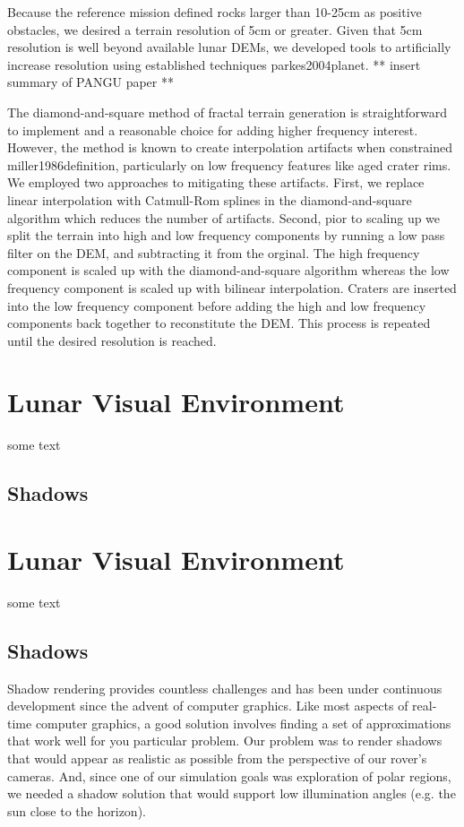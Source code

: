 \documentclass[twocolumn,letterpaper]{IEEEAerospaceCLS}  %
\begin{document}
Because the reference mission defined rocks larger than 10-25cm as positive obstacles, we desired a terrain resolution of 5cm or greater. Given that 5cm resolution is well beyond available lunar DEMs, we developed tools to artificially increase resolution using established techniques {parkes2004planet}. ** insert summary of PANGU paper **

The diamond-and-square method of fractal terrain generation is straightforward to implement and a reasonable choice for adding higher frequency interest. However, the method is known to create interpolation artifacts when constrained {miller1986definition}, particularly on low frequency features like aged crater rims. We employed two approaches to mitigating these artifacts. First, we replace linear interpolation with Catmull-Rom splines in the diamond-and-square algorithm which reduces the number of artifacts. Second, pior to scaling up we split the terrain into high and low frequency components by running a low pass filter on the DEM, and subtracting it from the orginal. The high frequency component is scaled up with the diamond-and-square algorithm whereas the low frequency component is scaled up with bilinear interpolation. Craters are inserted into the low frequency component before adding the high and low frequency components back together to reconstitute the DEM. This process is repeated until the desired resolution is reached. 
  
\section{Lunar Visual Environment}
some text

\subsection{Shadows}

\section{Lunar Visual Environment}
some text

\subsection{Shadows}
Shadow rendering provides countless challenges and has been under continuous development since the advent of computer graphics. Like most aspects of real-time computer graphics, a good solution involves finding a set of approximations that work well for you particular problem. Our problem was to render shadows that would appear as realistic as possible from the perspective of our rover's cameras. And, since one of our simulation goals was exploration of polar regions, we needed a shadow solution that would support low illumination angles (e.g. the sun close to the horizon).
\end{document}
